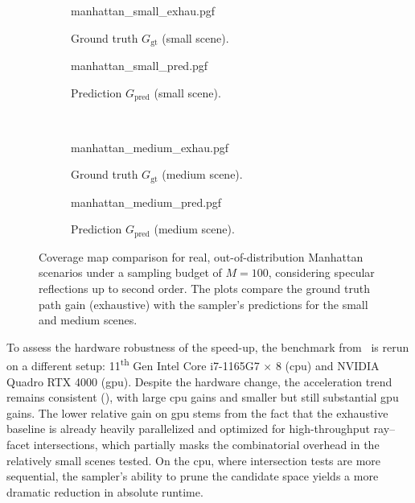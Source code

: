 \begin{figure}[htbp]
  \centering
  \begin{subfigure}[t]{0.495\contentwidth}
    \centering
    {manhattan_small_exhau.pgf}
    \caption{Ground truth $G_{\mathrm{gt}}$ (small scene).}
  \end{subfigure}
  \hfill
  \begin{subfigure}[t]{0.495\contentwidth}
    \centering
    {manhattan_small_pred.pgf}
    \caption{Prediction $G_{\mathrm{pred}}$ (small scene).}
  \end{subfigure}
  \\
  \begin{subfigure}[t]{0.495\contentwidth}
    \centering
    {manhattan_medium_exhau.pgf}
    \caption{Ground truth $G_{\mathrm{gt}}$ (medium scene).}
  \end{subfigure}
  \hfill
  \begin{subfigure}[t]{0.495\contentwidth}
    \centering
    {manhattan_medium_pred.pgf}
    \caption{Prediction $G_{\mathrm{pred}}$ (medium scene).}
  \end{subfigure}
  \caption{Coverage map comparison for real, out-of-distribution Manhattan scenarios under a sampling budget of $M=100$, considering specular reflections up to second order. The plots compare the ground truth path gain (exhaustive) with the sampler's predictions for the small and medium scenes.}
\end{figure}

To assess the hardware robustness of the speed-up, the benchmark from~ is rerun on a different setup: 11\textsuperscript{th} Gen Intel\textcopyright{} Core\texttrademark{} i7-1165G7 $\times$ 8 (\gls{cpu}) and NVIDIA Quadro RTX\texttrademark{} 4000 (\gls{gpu}). Despite the hardware change, the acceleration trend remains consistent (), with large \gls{cpu} gains and smaller but still substantial \gls{gpu} gains. The lower relative gain on \gls{gpu} stems from the fact that the exhaustive baseline is already heavily parallelized and optimized for high-throughput ray--facet intersections, which partially masks the combinatorial overhead in the relatively small scenes tested. On the \gls{cpu}, where intersection tests are more sequential, the sampler's ability to prune the candidate space yields a more dramatic reduction in absolute runtime.

